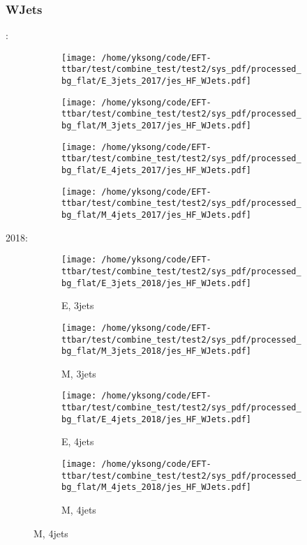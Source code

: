\documentclass{beamer}
\begin{document}
\begin{frame}
\frametitle{WJets}
\fontsize{5}{1}:
\begin{figure}
\centering
\begin{subfigure}[b]{0.24\textwidth}
\texttt{[image: /home/yksong/code/EFT-ttbar/test/combine\_test/test2/sys\_pdf/processed\_bg\_flat/E\_3jets\_2017/jes\_HF\_WJets.pdf]}
\end{subfigure}
\begin{subfigure}[b]{0.24\textwidth}
\texttt{[image: /home/yksong/code/EFT-ttbar/test/combine\_test/test2/sys\_pdf/processed\_bg\_flat/M\_3jets\_2017/jes\_HF\_WJets.pdf]}
\end{subfigure}
\begin{subfigure}[b]{0.24\textwidth}
\texttt{[image: /home/yksong/code/EFT-ttbar/test/combine\_test/test2/sys\_pdf/processed\_bg\_flat/E\_4jets\_2017/jes\_HF\_WJets.pdf]}
\end{subfigure}
\begin{subfigure}[b]{0.24\textwidth}
\texttt{[image: /home/yksong/code/EFT-ttbar/test/combine\_test/test2/sys\_pdf/processed\_bg\_flat/M\_4jets\_2017/jes\_HF\_WJets.pdf]}
\end{subfigure}
\end{figure}
2018:
\begin{figure}
\centering
\begin{subfigure}[b]{0.24\textwidth}
\texttt{[image: /home/yksong/code/EFT-ttbar/test/combine\_test/test2/sys\_pdf/processed\_bg\_flat/E\_3jets\_2018/jes\_HF\_WJets.pdf]}
\captionsetup{font=tiny}
\caption{E, 3jets}
\end{subfigure}
\begin{subfigure}[b]{0.24\textwidth}
\texttt{[image: /home/yksong/code/EFT-ttbar/test/combine\_test/test2/sys\_pdf/processed\_bg\_flat/M\_3jets\_2018/jes\_HF\_WJets.pdf]}
\captionsetup{font=tiny}
\caption{M, 3jets}
\end{subfigure}
\begin{subfigure}[b]{0.24\textwidth}
\texttt{[image: /home/yksong/code/EFT-ttbar/test/combine\_test/test2/sys\_pdf/processed\_bg\_flat/E\_4jets\_2018/jes\_HF\_WJets.pdf]}
\captionsetup{font=tiny}
\caption{E, 4jets}
\end{subfigure}
\begin{subfigure}[b]{0.24\textwidth}
\texttt{[image: /home/yksong/code/EFT-ttbar/test/combine\_test/test2/sys\_pdf/processed\_bg\_flat/M\_4jets\_2018/jes\_HF\_WJets.pdf]}
\captionsetup{font=tiny}
\caption{M, 4jets}
\end{subfigure}
\end{figure}
\end{frame}
\end{document}
